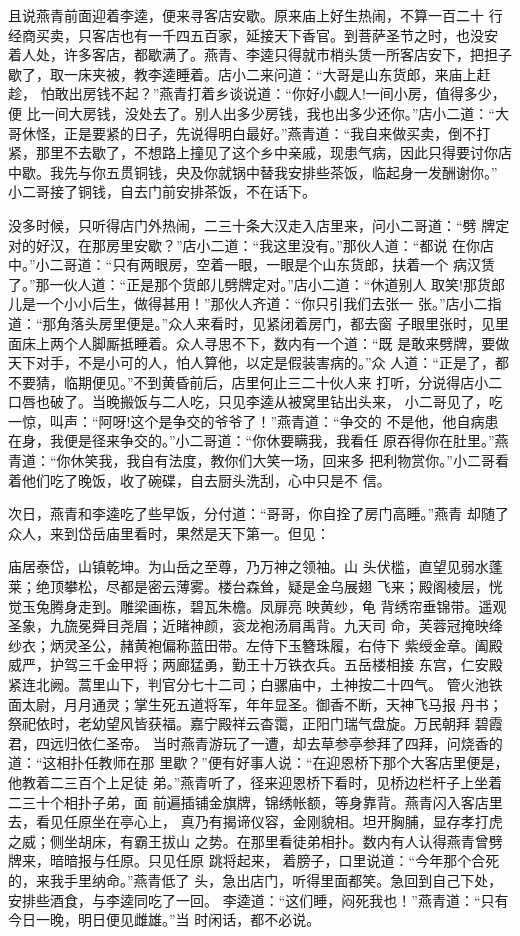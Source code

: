 且说燕青前面迎着李逵，便来寻客店安歇。原来庙上好生热闹，不算一百二十
行经商买卖，只客店也有一千四五百家，延接天下香官。到菩萨圣节之时，也没安
着人处，许多客店，都歇满了。燕青、李逵只得就市梢头赁一所客店安下，把担子
歇了，取一床夹被，教李逵睡着。店小二来问道：“大哥是山东货郎，来庙上赶趁，
怕敢出房钱不起？”燕青打着乡谈说道：“你好小觑人!一间小房，值得多少，便
比一间大房钱，没处去了。别人出多少房钱，我也出多少还你。”店小二道：“大
哥休怪，正是要紧的日子，先说得明白最好。”燕青道：“我自来做买卖，倒不打
紧，那里不去歇了，不想路上撞见了这个乡中亲戚，现患气病，因此只得要讨你店
中歇。我先与你五贯铜钱，央及你就锅中替我安排些茶饭，临起身一发酬谢你。”
小二哥接了铜钱，自去门前安排茶饭，不在话下。

没多时候，只听得店门外热闹，二三十条大汉走入店里来，问小二哥道：“劈
牌定对的好汉，在那房里安歇？”店小二道：“我这里没有。”那伙人道：“都说
在你店中。”小二哥道：“只有两眼房，空着一眼，一眼是个山东货郎，扶着一个
病汉赁了。”那一伙人道：“正是那个货郎儿劈牌定对。”店小二道：“休道别人
取笑!那货郎儿是一个小小后生，做得甚用！”那伙人齐道：“你只引我们去张一
张。”店小二指道：“那角落头房里便是。”众人来看时，见紧闭着房门，都去窗
子眼里张时，见里面床上两个人脚厮抵睡着。众人寻思不下，数内有一个道：“既
是敢来劈牌，要做天下对手，不是小可的人，怕人算他，以定是假装害病的。”众
人道：“正是了，都不要猜，临期便见。”不到黄昏前后，店里何止三二十伙人来
打听，分说得店小二口唇也破了。当晚搬饭与二人吃，只见李逵从被窝里钻出头来，
小二哥见了，吃一惊，叫声：“阿呀!这个是争交的爷爷了！”燕青道：“争交的
不是他，他自病患在身，我便是径来争交的。”小二哥道：“你休要瞒我，我看任
原吞得你在肚里。”燕青道：“你休笑我，我自有法度，教你们大笑一场，回来多
把利物赏你。”小二哥看着他们吃了晚饭，收了碗碟，自去厨头洗刮，心中只是不
信。

次日，燕青和李逵吃了些早饭，分付道：“哥哥，你自拴了房门高睡。”燕青
却随了众人，来到岱岳庙里看时，果然是天下第一。但见：

庙居泰岱，山镇乾坤。为山岳之至尊，乃万神之领袖。山
头伏槛，直望见弱水蓬莱；绝顶攀松，尽都是密云薄雾。楼台森耸，疑是金乌展翅
飞来；殿阁棱层，恍觉玉兔腾身走到。雕梁画栋，碧瓦朱檐。凤扉亮映黄纱，龟
背绣帘垂锦带。遥观圣象，九旒冕舜目尧眉；近睹神颜，衮龙袍汤肩禹背。九天司
命，芙蓉冠掩映绛纱衣；炳灵圣公，赭黄袍偏称蓝田带。左侍下玉簪珠履，右侍下
紫绶金章。阖殿威严，护驾三千金甲将；两廊猛勇，勤王十万铁衣兵。五岳楼相接
东宫，仁安殿紧连北阙。蒿里山下，判官分七十二司；白骡庙中，土神按二十四气。
管火池铁面太尉，月月通灵；掌生死五道将军，年年显圣。御香不断，天神飞马报
丹书；祭祀依时，老幼望风皆获福。嘉宁殿祥云杳霭，正阳门瑞气盘旋。万民朝拜
碧霞君，四远归依仁圣帝。
当时燕青游玩了一遭，却去草参亭参拜了四拜，问烧香的道：“这相扑任教师在那
里歇？”便有好事人说：“在迎恩桥下那个大客店里便是，他教着二三百个上足徒
弟。”燕青听了，径来迎恩桥下看时，见桥边栏杆子上坐着二三十个相扑子弟，面
前遍插铺金旗牌，锦绣帐额，等身靠背。燕青闪入客店里去，看见任原坐在亭心上，
真乃有揭谛仪容，金刚貌相。坦开胸脯，显存孝打虎之威；侧坐胡床，有霸王拔山
之势。在那里看徒弟相扑。数内有人认得燕青曾劈牌来，暗暗报与任原。只见任原
跳将起来，着膀子，口里说道：“今年那个合死的，来我手里纳命。”燕青低了
头，急出店门，听得里面都笑。急回到自己下处，安排些酒食，与李逵同吃了一回。
李逵道：“这们睡，闷死我也！”燕青道：“只有今日一晚，明日便见雌雄。”当
时闲话，都不必说。

